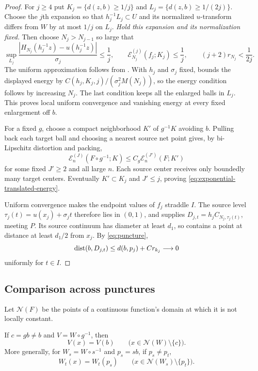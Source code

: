 \begin{proof}
For $j\ge4$ put
$K_j=\{d(z,b)\ge1/j\}$ and $L_j=\{d(z,b)\ge1/(2j)\}$.
Choose the $j$th expansion so that $h_j^{-1}L_j\subset U$ and its
normalized $u$-transform differs from $W$ by at most $1/j$ on $L_j$.
\emph{Hold this expansion and its normalization fixed.} Then choose
$N_j>N_{j-1}$ so large that
\[
 \sup_{L_j}\frac{|H_{N_j}(h_j^{-1}z)-u(h_j^{-1}z)|}{\sigma_j}
 \le\frac1j,
 \qquad \mathcal E_{N_j}^{(j)}(f_j;K_j)\le\frac1j,
 \qquad (j+2)r_{N_j}<\frac1{2j}.
\]
The uniform approximation follows from .
With $h_j$ and $\sigma_j$ fixed,  bounds
the displayed energy by $C(h_j,K_j,j)/(\sigma_j^2M(N_j))$, so the
energy condition follows by increasing $N_j$. The last condition
keeps all the enlarged balls in $L_j$. This proves local uniform
convergence and vanishing energy at every fixed enlargement off $b$.

For a fixed $g$, choose a compact neighborhood $K'$ of $g^{-1}K$
avoiding $b$. Pulling back each target ball and choosing a nearest
source net point gives, by bi-Lipschitz distortion and packing,
\[
 \mathcal E_n^{(J)}(F\circ g^{-1};K)
 \le C_g\mathcal E_n^{(J')}(F;K')
\]
for some fixed $J'\ge2$ and all large $n$. Each source center receives
only boundedly many target centers. Eventually $K'\subset K_j$ and
$J'\le j$, proving \eqref{eq:exponential-translated-energy}.

Uniform convergence makes the endpoint values of $f_j$ straddle $I$.
The source level $\tau_j(t)=u(x_j)+\sigma_jt$ therefore lies in $(0,1)$,
and  supplies
$D_{j,t}=h_jC_{N_j,\tau_j(t)}$, meeting $P$.
Its source continuum has diameter at least $d_1$, so contains a point
at distance at least $d_1/2$ from $x_j$. By \eqref{eq:puncture},
\[
 \operatorname{dist}(b,D_{j,t})\le d(b,p_j)+Cr_{k_j}\longrightarrow0
\]
uniformly for $t\in I$.
\end{proof}

\subsection{Comparison across punctures}

Let $\mathcal N(F)$ be the points of a continuous function's domain
at which it is not locally constant.

\begin{lemma}
\label{lem:exponential-comparison}
If $c=gb\ne b$ and $V=W\circ g^{-1}$, then
\begin{equation}
 V(x)=V(b)\qquad
 \bigl(x\in\mathcal N(W)\setminus\{c\}\bigr).
 \label{eq:transform-level}
\end{equation}
More generally, for $W_s=W\circ s^{-1}$ and $p_s=sb$, if $p_s\ne p_t$,
\begin{equation}
 W_t(x)=W_t(p_s)\qquad
 \bigl(x\in\mathcal N(W_s)\setminus\{p_t\}\bigr).
 \label{eq:two-transform-level}
\end{equation}
\end{lemma}

